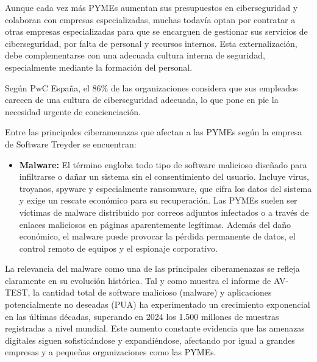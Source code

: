 \documentclass[a4paper, 10pt]{article}
\begin{document}
Aunque cada vez más PYMEs aumentan sus presupuestos en ciberseguridad y colaboran con empresas especializadas, muchas todavía optan por contratar a otras empresas especializadas para que se encarguen de gestionar sus servicios de ciberseguridad, 
por falta de personal y recursos internos. Esta 
externalización, debe complementarse con una adecuada cultura interna de seguridad, especialmente mediante la formación del personal.
\par\vspace{0.5cm}

Según PwC España, el 86\% de las organizaciones considera que sus empleados carecen de una cultura de ciberseguridad adecuada, lo que pone en pie la necesidad urgente de concienciación.\cite{pow}
\par\vspace{0.5cm}

Entre las principales ciberamenazas que afectan a las PYMEs según la empresa de Software Treyder \cite{treider} se encuentran:

\begin{itemize}
    \item \textbf{Malware:}  
    El término engloba todo tipo de software malicioso diseñado para infiltrarse o dañar un sistema sin el consentimiento del usuario. Incluye virus, troyanos, spyware y especialmente ransomware, que cifra los datos del sistema y exige un rescate económico para su recuperación. Las PYMEs suelen ser víctimas de malware distribuido por correos adjuntos infectados o a través de enlaces maliciosos en páginas aparentemente legítimas. Además del daño económico, el malware puede provocar la pérdida permanente de datos, el control remoto de equipos y el espionaje corporativo.
\end{itemize}

\vspace{0.5cm}

La relevancia del malware como una de las principales ciberamenazas se refleja claramente en su evolución histórica. Tal y como muestra el informe de AV-TEST, la cantidad total de software malicioso (malware) y aplicaciones potencialmente no deseadas (PUA) ha experimentado un crecimiento exponencial en las últimas décadas, superando en 2024 los 1.500 millones de muestras registradas a nivel mundial. Este aumento constante evidencia que las amenazas digitales siguen sofisticándose y expandiéndose, afectando por igual a grandes empresas y a pequeñas organizaciones como las PYMEs.

\vspace{0.3cm}
\end{document}
